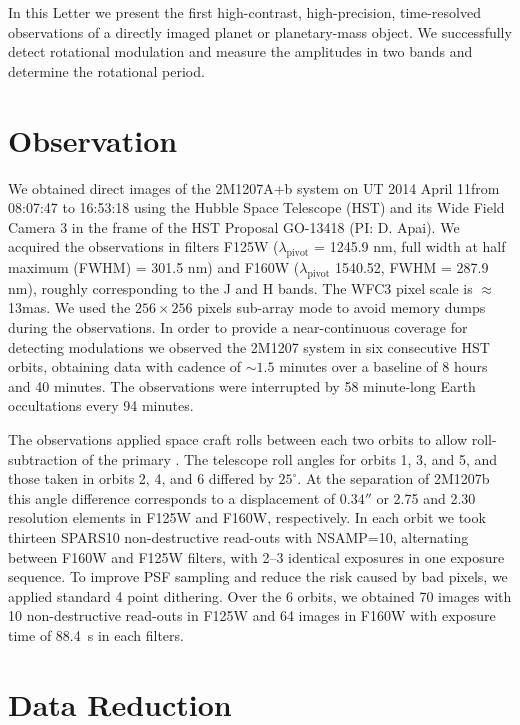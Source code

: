 \documentclass[apj]{emulateapj}
\newcommand{\ima}{\texttt{ima} files }
\newcommand{\flt}{\texttt{flt} files }
\begin{document}
In this Letter we present the first high-contrast, high-precision,
time-resolved observations of a directly imaged planet or
planetary-mass object. We successfully detect rotational modulation
and measure the amplitudes in two bands and determine the rotational
period.

\section{Observation} We obtained direct images of the 2M1207A+b
system on UT 2014 April 11from 08:07:47 to 16:53:18 using the Hubble
Space Telescope (HST) and its Wide Field Camera 3 \citep[WFC3,
][]{Kimble2008} in the frame of the HST Proposal GO-13418 (PI:
D. Apai). We acquired the observations in filters F125W
($\lambda_{\mbox{pivot}}$ = 1245.9 nm, full width at half maximum
(FWHM) = 301.5 nm) and F160W ($\lambda_{\mbox{pivot}}$ 1540.52, FWHM =
287.9 nm), roughly corresponding to the J and H bands. The WFC3 pixel
scale is $\approx$13mas. We used the $256\times256$ pixels sub-array
mode to avoid memory dumps during the observations.  In order to
provide a near-continuous coverage for detecting modulations we
observed the 2M1207 system in six consecutive HST orbits, obtaining
data with cadence of $\sim1.5$ minutes over a baseline of 8 hours and
40 minutes. The observations were interrupted by 58 minute-long Earth
occultations every 94 minutes.

The observations applied space craft rolls between each two orbits to
allow roll-subtraction of the primary \citep[e.g.][]{Song2006}. The
telescope roll angles for orbits 1, 3, and 5, and those taken in
orbits 2, 4, and 6 differed by $25^{\circ}$. At the separation of
2M1207b this angle difference corresponds to a displacement of
$0.34''$ or 2.75 and 2.30 resolution elements in F125W and F160W,
respectively. In each orbit we took thirteen SPARS10 non-destructive
read-outs with NSAMP=10, alternating between F160W and F125W filters,
with 2--3 identical exposures in one exposure sequence. To improve PSF
sampling and reduce the risk caused by bad pixels, we applied standard
4 point dithering. Over the 6 orbits, we obtained 70 images with 10
non-destructive read-outs in F125W and 64 images in F160W with
exposure time of 88.4~s in each filters.

\section{Data Reduction}

\end{document}
